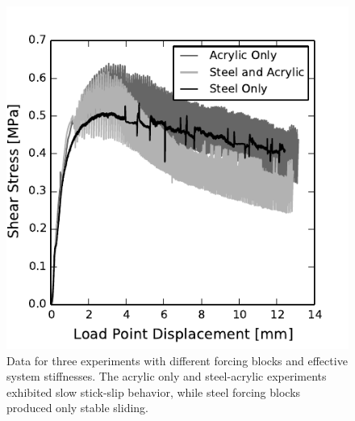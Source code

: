 \begin{figure}
\begin{center}
\includegraphics{chap_granular_stiffness/Fig5.pdf}
\caption{\label{fig:comp_runplots}
Data for three experiments with different forcing blocks and effective system stiffnesses.  The acrylic only and steel-acrylic experiments exhibited slow stick-slip behavior, while steel forcing blocks produced only stable sliding.}
\end{center}
\end{figure}



